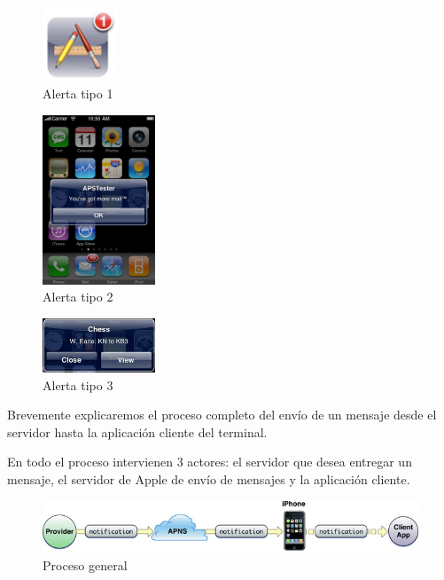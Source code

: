      \begin{figure}[h!]
    \centering
       \includegraphics[width=0.2\textwidth]{./images/badged_app.jpg}
     \caption{Alerta tipo 1 }
   \label{fig:Alerta 1}
\end{figure}

\begin{figure}[h!]
    \centering
       \includegraphics[width=0.3\textwidth]{./images/notif_msg_one_button.jpg}
     \caption{Alerta tipo 2 }
   \label{fig:Alerta 2}
\end{figure}

\begin{figure}[h!]
    \centering
       \includegraphics[width=0.3\textwidth]{./images/alert.jpg}
     \caption{Alerta tipo 3 }
   \label{fig:Alerta 3}
\end{figure}

     
    Brevemente explicaremos el proceso completo del envío de un mensaje desde el servidor hasta la aplicación cliente del terminal. 
    
    En todo el proceso intervienen 3 actores: el servidor que desea entregar un mensaje, el servidor de Apple de envío de mensajes y la aplicación cliente.
    
 \begin{figure}[h!]
    \centering
       \includegraphics[width=0.95\linewidth]{./images/remote_notif_simple.jpg}
     \caption{Proceso general }
   \label{fig:Notificacion proceso}
\end{figure}

